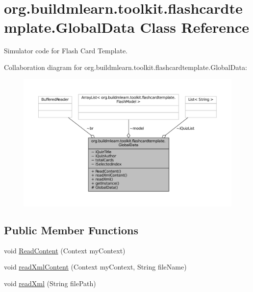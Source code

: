 \hypertarget{classorg_1_1buildmlearn_1_1toolkit_1_1flashcardtemplate_1_1GlobalData}{\section{org.\-buildmlearn.\-toolkit.\-flashcardtemplate.\-Global\-Data Class Reference}
\label{classorg_1_1buildmlearn_1_1toolkit_1_1flashcardtemplate_1_1GlobalData}
}


Simulator code for Flash Card Template.  




Collaboration diagram for org.\-buildmlearn.\-toolkit.\-flashcardtemplate.\-Global\-Data\-:
\nopagebreak
\begin{figure}[H]
\begin{center}
\leavevmode
\includegraphics[width=350pt]{df/dee/classorg_1_1buildmlearn_1_1toolkit_1_1flashcardtemplate_1_1GlobalData__coll__graph}
\end{center}
\end{figure}
\subsection*{Public Member Functions}
\begin{DoxyCompactItemize}
\item 
void \hyperlink{classorg_1_1buildmlearn_1_1toolkit_1_1flashcardtemplate_1_1GlobalData_a557d8564eb6f0b690149ffaf037b9ef3}{Read\-Content} (Context my\-Context)
\item 
void \hyperlink{classorg_1_1buildmlearn_1_1toolkit_1_1flashcardtemplate_1_1GlobalData_acb83309f356c3f19a859bc9a0151ebc9}{read\-Xml\-Content} (Context my\-Context, String file\-Name)
\item 
void \hyperlink{classorg_1_1buildmlearn_1_1toolkit_1_1flashcardtemplate_1_1GlobalData_a8ff4d4f473a34a7456a3c0209d6eec0b}{read\-Xml} (String file\-Path)
\end{DoxyCompactItemize}
